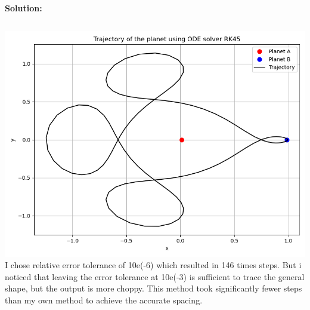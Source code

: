 \documentclass[a4paper,12pt]{scrartcl} %
\newenvironment{solution}
  {\par\color{answercolor}\textbf{Solution:}\ }
  {\par}
\theoremstyle{darktheorem}
\begin{document}
\begin{solution}
\begin{enumerate}
\begin{lstlisting}
            \end{lstlisting}
            \includegraphics[width = \textwidth]{ode45.png}
            I chose relative error tolerance of 10e(-6) which resulted in 146 times steps. But i noticed that leaving the error tolerance 
            at 10e(-3) is sufficient to trace the general shape, but the output is more choppy.
            This method took significantly fewer steps than my own method to achieve the accurate spacing.
    \end{enumerate}
\end{solution}
\end{document}
